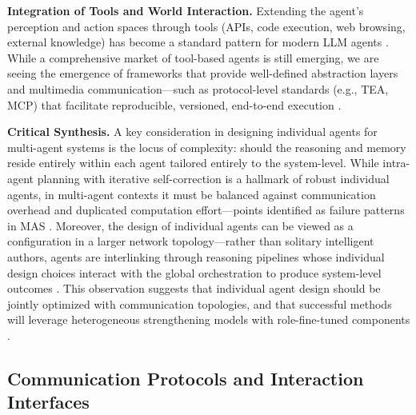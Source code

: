 \documentclass[11pt,a4paper]{article}
\begin{document}
\textbf{Integration of Tools and World Interaction.} Extending the agent's perception and action spaces through tools (APIs, code execution, web browsing, external knowledge) has become a standard pattern for modern LLM agents \cite{arxiv:2308.11432v5}. While a comprehensive market of tool-based agents is still emerging, we are seeing the emergence of frameworks that provide well-defined abstraction layers and multimedia communication---such as protocol-level standards (e.g., TEA, MCP) that facilitate reproducible, versioned, end-to-end execution \cite{arxiv:2506.12508v6}.

\textbf{Critical Synthesis.} A key consideration in designing individual agents for multi-agent systems is the locus of complexity: should the reasoning and memory reside entirely within each agent tailored entirely to the system-level. While intra-agent planning with iterative self-correction is a hallmark of robust individual agents, in multi-agent contexts it must be balanced against communication overhead and duplicated computation effort---points identified as failure patterns in MAS \cite{arxiv:2503.13657v3}. Moreover, the design of individual agents can be viewed as a configuration in a larger network topology---rather than solitary intelligent authors, agents are interlinking through reasoning pipelines whose individual design choices interact with the global orchestration to produce system-level outcomes \cite{arxiv:2502.02533v2}. This observation suggests that individual agent design should be jointly optimized with communication topologies, and that successful methods will leverage heterogeneous strengthening models with role-fine-tuned components \cite{arxiv:2502.11133v1}.


\subsection{Communication Protocols and Interaction Interfaces}
\end{document}
